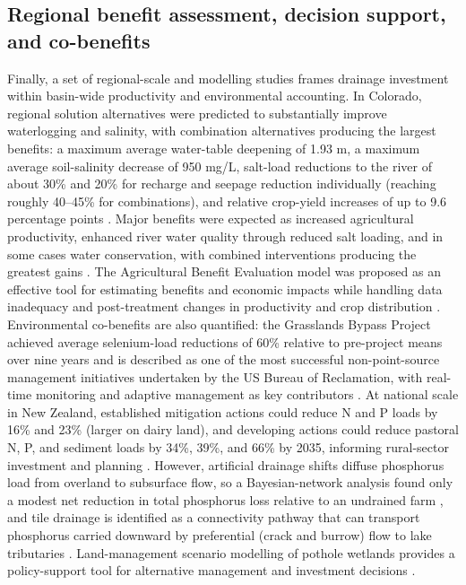 \subsection{Regional benefit assessment, decision support, and co-benefits}
Finally, a set of regional-scale and modelling studies frames drainage investment within basin-wide productivity and environmental accounting. In Colorado, regional solution alternatives were predicted to substantially improve waterlogging and salinity, with combination alternatives producing the largest benefits: a maximum average water-table deepening of 1.93 m, a maximum average soil-salinity decrease of 950 mg/L, salt-load reductions to the river of about 30\% and 20\% for recharge and seepage reduction individually (reaching roughly 40--45\% for combinations), and relative crop-yield increases of up to 9.6 percentage points \parencite{Burkhalter2006}. Major benefits were expected as increased agricultural productivity, enhanced river water quality through reduced salt loading, and in some cases water conservation, with combined interventions producing the greatest gains \parencite{Burkhalter2006}. The Agricultural Benefit Evaluation model was proposed as an effective tool for estimating benefits and economic impacts while handling data inadequacy and post-treatment changes in productivity and crop distribution \parencite{ROBINSON1992}. Environmental co-benefits are also quantified: the Grasslands Bypass Project achieved average selenium-load reductions of 60\% relative to pre-project means over nine years and is described as one of the most successful non-point-source management initiatives undertaken by the US Bureau of Reclamation, with real-time monitoring and adaptive management as key contributors \parencite{Quinn2009}. At national scale in New Zealand, established mitigation actions could reduce N and P loads by 16\% and 23\% (larger on dairy land), and developing actions could reduce pastoral N, P, and sediment loads by 34\%, 39\%, and 66\% by 2035, informing rural-sector investment and planning \parencite{McDowell2021}. However, artificial drainage shifts diffuse phosphorus load from overland to subsurface flow, so a Bayesian-network analysis found only a modest net reduction in total phosphorus loss relative to an undrained farm \parencite{Lucci2014}, and tile drainage is identified as a connectivity pathway that can transport phosphorus carried downward by preferential (crack and burrow) flow to lake tributaries \parencite{Allaire2011,Dadfar2010}. Land-management scenario modelling of pothole wetlands provides a policy-support tool for alternative management and investment decisions \parencite{Upadhyay2019}.

